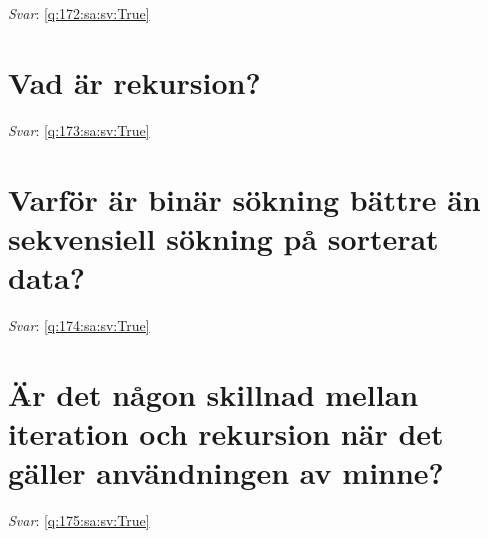 \documentclass[a4paper,11pt,oneside]{book}
\begin{document}
\begin{sloppypar}
\label{q:172:sa:sv:False}

\vspace{2cm}

\noindent\makebox[\textwidth]{\hrulefill}

\vspace{1cm}

\textit{Svar}: \autoref{q:172:sa:sv:True}



\section{Vad \"ar rekursion?}

\label{q:173:sa:sv:False}

\vspace{2cm}

\noindent\makebox[\textwidth]{\hrulefill}

\vspace{1cm}

\textit{Svar}: \autoref{q:173:sa:sv:True}



\section{Varf\"or \"ar bin\"ar s\"okning b\"attre \"an sekvensiell s\"okning p\r{a} sorterat data?}

\label{q:174:sa:sv:False}

\vspace{2cm}

\noindent\makebox[\textwidth]{\hrulefill}

\vspace{1cm}

\textit{Svar}: \autoref{q:174:sa:sv:True}



\section{\"A\ensuremath{\ddot{}}r det n\r{a}gon skillnad mellan iteration och rekursion n\"ar det g\"aller anv\"andningen av minne?}

\label{q:175:sa:sv:False}

\vspace{2cm}

\noindent\makebox[\textwidth]{\hrulefill}

\vspace{1cm}

\textit{Svar}: \autoref{q:175:sa:sv:True}




\end{sloppypar}
\end{document}
